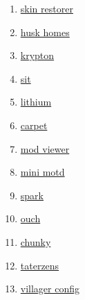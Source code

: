 \begin{enumerate}
    \item \href{https://github.com/Suiranoil/SkinRestorer}{skin restorer}
    \item \href{https://github.com/WiIIiam278/HuskHomes/}{husk homes}
    \item \href{https://github.com/astei/krypton}{krypton}
    \item \href{https://github.com/bl4ckscor3/Sit}{sit}
    \item \href{https://github.com/caffeinemc/lithium-fabric}{lithium}
    \item \href{https://github.com/gnembon/fabric-carpet}{carpet}
    \item \href{https://github.com/haykam821/Mod-Viewer}{mod viewer}
    \item \href{https://github.com/jpenilla/MiniMOTD}{mini motd}
    \item \href{https://github.com/lucko/spark}{spark}
    \item \href{https://github.com/patbox/ouch}{ouch}
    \item \href{https://github.com/pop4959/Chunky}{chunky}
    \item \href{https://github.com/samolego/Taterzens/}{taterzens}
    \item \href{https://modrinth.com/mod/villagerconfig}{villager config}
\end{enumerate}


